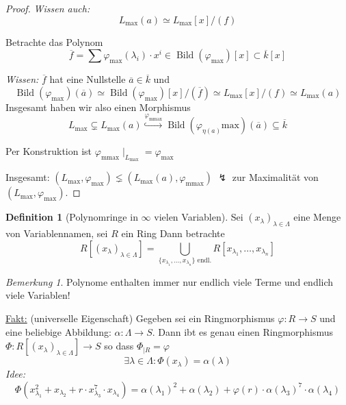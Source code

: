 \documentclass[12pt,parskip=full]{scrartcl}
\newcommand{\heading}{\underline}
\theoremstyle{definition}
\newtheorem{definition}[theorem]{Definition}
\theoremstyle{remark}
\newtheorem*{remark}{Bemerkung}
\begin{document}
\begin{proof}
		\textit{Wissen auch:}
		\begin{equation*}
			L_\text{max}(a) \simeq L_\text{max}[x] / (f)
		\end{equation*}
		
		Betrachte das Polynom
		\begin{equation*}
			\overline{f} = \sum \varphi_\text{max}(\lambda_i) \cdot x^i \in \operatorname{Bild}(\varphi_\text{max})[x] \subset \overline{k}[x]
		\end{equation*}
		
		\textit{Wissen:} $\overline{f}$ hat eine Nullstelle $\overline{a} \in \overline{k}$ und 
		\begin{equation*}
			\operatorname{Bild}(\varphi_\text{max})(\overline{a}) \simeq \operatorname{Bild}(\varphi_\text{max})[x] / (\overline{f}) \simeq L_\text{max}[x]/ (f) \simeq L_\text{max}(a)
		\end{equation*}
		Insgesamt haben wir also einen Morphismus
		\begin{equation*}
			L_\text{max} \subsetneq L_\text{max}(a) \overset{\varphi_\text{mmax}}{\hookrightarrow} \operatorname{Bild}(\varphi_{\eta(a)}\text{max})(\overline{a}) \subseteq \overline{k}
		\end{equation*}
		
		Per Konstruktion ist $\varphi_\text{mmax} \mid_{L_\text{max}} = \varphi_\text{max}$
		
		Insgesamt: $(L_\text{max}, \varphi_\text{max}) \lneq (L_\text{max}(a), \varphi_\text{mmax})$ $\lightning$ zur Maximalität von $(L_\text{max}, \varphi_\text{max})$.
	\end{proof}

	\begin{definition}[Polynomringe in $\infty$ vielen Variablen]
		Sei $(x_\lambda)_{\lambda \in \Lambda}$ eine Menge von Variablennamen, sei $R$ ein Ring Dann betrachte
		\begin{equation*}
			R[(x_\lambda)_{\lambda \in \Lambda}] = \bigcup_{ \{ x_{\lambda_1}, \dots, x_{\lambda_n} \} \text{ endl.} } R[x_{\lambda_1}, \dots, x_{\lambda_n}]
		\end{equation*}
	\end{definition}

	\begin{remark}
		Polynome enthalten immer nur endlich viele Terme und endlich viele Variablen!
	\end{remark}

	\heading{Fakt:} (universelle Eigenschaft) Gegeben sei ein Ringmorphismus $\varphi: R \to S$ und eine beliebige Abbildung: $\alpha: \Lambda \to S$. Dann ibt es genau einen Ringmorphismus $\Phi: R[(x_\lambda)_{\lambda \in \Lambda}] \to S$ so dass $\Phi_{\mid R} = \varphi$
	\begin{equation*}
		\exists \lambda \in \Lambda: \Phi(x_\lambda) = \alpha(\lambda)
	\end{equation*}
	\textit{Idee:}
	\begin{equation*}
		\Phi(x_{\lambda_1}^2 + x_{\lambda_2} + r \cdot x_{\lambda_3}^7 \cdot x_{\lambda_4}) = \alpha(\lambda_1)^2 + \alpha(\lambda_2) + \varphi(r) \cdot \alpha(\lambda_3)^7 \cdot \alpha(\lambda_4)
	\end{equation*}
\end{document}
